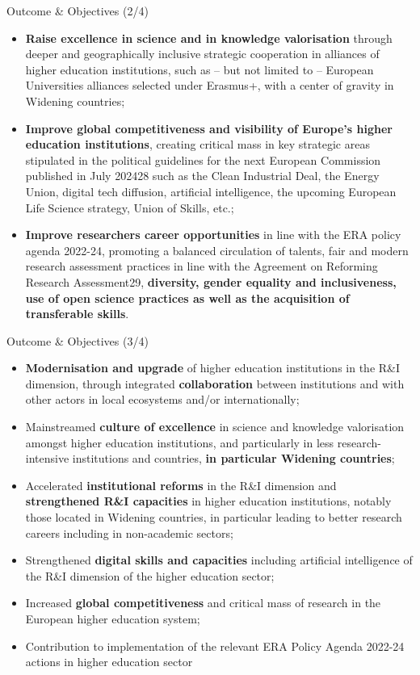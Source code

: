 \documentclass{beamer}
\begin{document}
\begin{frame}{Outcome \& Objectives (2/4)}
  
\footnotesize
\begin{itemize}
  \item \textbf{Raise excellence in science and in knowledge valorisation} through deeper and
geographically inclusive strategic cooperation in alliances of higher education
institutions, such as – but not limited to – European Universities alliances selected under
Erasmus+, with a center of gravity in Widening countries;
  \item \textbf{Improve global competitiveness and visibility of Europe’s higher education institutions},
creating critical mass in key strategic areas stipulated in the political guidelines for the
next European Commission published in July 202428 such as the Clean Industrial Deal,
the Energy Union, digital tech diffusion, artificial intelligence, the upcoming European
Life Science strategy, Union of Skills, etc.;
  \item \textbf{Improve researchers career opportunities} in line with the ERA policy agenda 2022-24,
promoting a balanced circulation of talents, fair and modern research assessment
practices in line with the Agreement on Reforming Research Assessment29, \textbf{diversity,
gender equality and inclusiveness, use of open science practices as well as the
acquisition of transferable skills}.
\end{itemize}
\end{frame}

\begin{frame}{Outcome \& Objectives (3/4)}
  
\footnotesize
\begin{itemize}
\item \textbf{Modernisation and upgrade} of higher education institutions in the R\&I dimension,
through integrated \textbf{collaboration} between institutions and with other actors in local
ecosystems and/or internationally;
\item Mainstreamed \textbf{culture of excellence} in science and knowledge valorisation amongst
higher education institutions, and particularly in less research-intensive institutions and
countries, \textbf{in particular Widening countries};
\item Accelerated \textbf{institutional reforms} in the R\&I dimension and \textbf{strengthened R\&I capacities}
in higher education institutions, notably those located in Widening countries, in
particular leading to better research careers including in non-academic sectors;
\item Strengthened \textbf{digital skills and capacities} including artificial intelligence of the R\&I
dimension of the higher education sector;
\item Increased \textbf{global competitiveness} and critical mass of research in the European higher
education system;
\item Contribution to implementation of the relevant ERA Policy Agenda 2022-24 actions in
higher education sector 
\end{itemize}
\end{frame}
\end{document}
